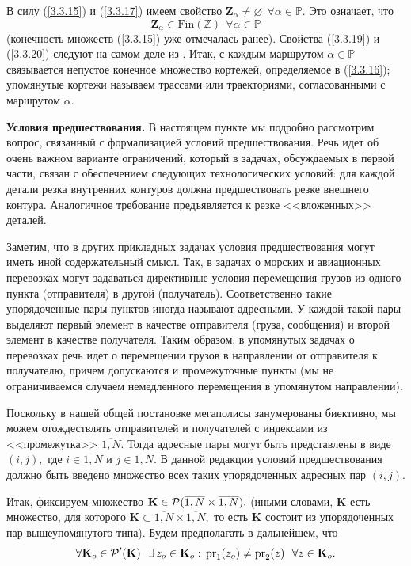 \documentclass[11pt,twoside,openany]{report}
\newcommand{\bfn}{\begin{equation}}
\newcommand{\efn}{\end{equation}}
\newcommand{\ov}{\overline}
\newcommand{\al}{\alpha}
\newcommand{\su}{\subset}
\newcommand{\fa}{\forall}
\newcommand{\cp}{{\cal P}}
\newcommand{\bbz}{{\mathbb Z}}
\newcommand{\bbp}{{\mathbb P}}
\newcommand{\emp}{\varnothing}
\begin{document}
В силу (\ref{3.3.15}) и (\ref{3.3.17})
имеем свойство
$\mathbf{Z}_\al\neq \emp\ \ \fa \al\in \bbp.$
Это означает, что
\bfn
  \label{3.3.20}
  \mathbf{Z}_\al\in \mathrm{Fin}(\bbz)\ \ \fa \al\in \bbp
\efn
(конечность множеств (\ref{3.3.15}) уже отмечалась ранее).
Свойства (\ref{3.3.19}) и (\ref{3.3.20})
следуют на самом деле из \cite[(3.21)]{Cha3`}.
Итак, с каждым маршрутом $\al\in\bbp$
связывается непустое конечное множество
кортежей, определяемое в (\ref{3.3.16});
упомянутые кортежи называем трассами
или траекториями, согласованными с маршрутом $\al.$

{\bf Условия предшествования.}
В настоящем пункте мы подробно рассмотрим вопрос,
связанный с формализацией условий предшествования.
Речь идет об очень важном
варианте ограничений, который в задачах,
обсуждаемых в первой части, связан с
обеспечением следующих технологических условий:
для каждой детали резка внутренних
контуров должна предшествовать резке внешнего контура.
Аналогичное требование
предъявляется к резке <<вложенных>> деталей.

Заметим, что в других прикладных задачах условия предшествования могут иметь
иной содержательный смысл.
Так, в задачах о морских и авиационных перевозках
могут задаваться директивные условия перемещения грузов из одного пункта
(отправителя) в другой (получатель).
Соответственно такие упорядоченные пары
пунктов иногда называют адресными.
У каждой такой пары выделяют первый элемент
в качестве отправителя (груза, сообщения)
и второй элемент в качестве получателя.
Таким образом, в упомянутых задачах о перевозках речь идет о перемещении грузов в
направлении от отправителя к получателю,
причем допускаются и промежуточные пункты
(мы не ограничиваемся случаем немедленного перемещения в упомянутом направлении).

Поскольку в нашей общей постановке мегаполисы занумерованы биективно,
мы можем отождествлять отправителей и получателей с индексами из <<промежутка>>
$\ov{1,N}.$
Тогда адресные пары могут быть представлены в виде $(i,j),$
где $i\in \ov{1,N}$
и $j\in \ov{1,N}.$
В данной редакции условий предшествования должно быть введено
множество всех таких упорядоченных адресных пар $(i,j).$

Итак, фиксируем множество
$\mathbf{K}\in \cp(\ov{1,N}\times \ov{1,N}),$
(иными словами,
$\mathbf{K}$ есть множество, для которого
$\mathbf{K}\su \ov{1,N} \times \ov{1,N},$
то есть $\mathbf{K}$ состоит из упорядоченных пар вышеупомянутого типа).
Будем предполагать в дальнейшем, что
\bfn
  \label{3.3.21}
  \fa \mathbf{K}_o\in \cp^\prime(\mathbf{K})\ \ \exists\, z_o\in \mathbf{K}_o:\,
  \mathrm{pr}_1(z_o)\neq \mathrm{pr}_2(z)\ \ \fa z\in \mathbf{K}_o.
\efn
\end{document}
